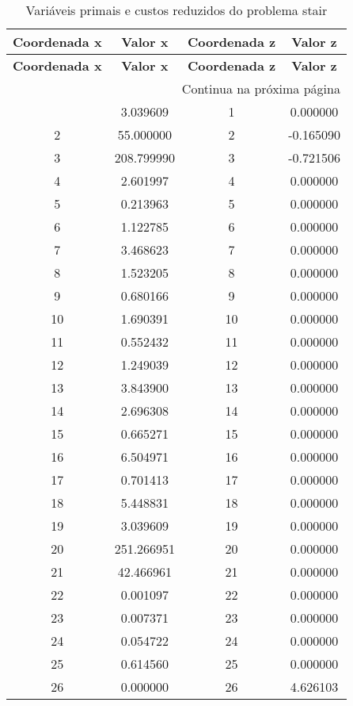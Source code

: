 \documentclass[12pt]{article}
\begin{document}
\begin{longtable}{@{}cccc@{}}
\caption{Variáveis primais e custos reduzidos do problema stair} \\
\toprule
\textbf{Coordenada x} & \textbf{Valor x} & \textbf{Coordenada z} & \textbf{Valor z} \\
\midrule
\endfirsthead

\toprule
\textbf{Coordenada x} & \textbf{Valor x} & \textbf{Coordenada z} & \textbf{Valor z} \\
\midrule
\endhead

\midrule \multicolumn{4}{r}{{Continua na próxima página}} \\ \midrule
\endfoot

\bottomrule
\endlastfoot
1 & 3.039609 & 1 & 0.000000 \\
2 & 55.000000 & 2 & -0.165090 \\
3 & 208.799990 & 3 & -0.721506 \\
4 & 2.601997 & 4 & 0.000000 \\
5 & 0.213963 & 5 & 0.000000 \\
6 & 1.122785 & 6 & 0.000000 \\
7 & 3.468623 & 7 & 0.000000 \\
8 & 1.523205 & 8 & 0.000000 \\
9 & 0.680166 & 9 & 0.000000 \\
10 & 1.690391 & 10 & 0.000000 \\
11 & 0.552432 & 11 & 0.000000 \\
12 & 1.249039 & 12 & 0.000000 \\
13 & 3.843900 & 13 & 0.000000 \\
14 & 2.696308 & 14 & 0.000000 \\
15 & 0.665271 & 15 & 0.000000 \\
16 & 6.504971 & 16 & 0.000000 \\
17 & 0.701413 & 17 & 0.000000 \\
18 & 5.448831 & 18 & 0.000000 \\
19 & 3.039609 & 19 & 0.000000 \\
20 & 251.266951 & 20 & 0.000000 \\
21 & 42.466961 & 21 & 0.000000 \\
22 & 0.001097 & 22 & 0.000000 \\
23 & 0.007371 & 23 & 0.000000 \\
24 & 0.054722 & 24 & 0.000000 \\
25 & 0.614560 & 25 & 0.000000 \\
26 & 0.000000 & 26 & 4.626103 \\

\end{longtable}
\end{document}
